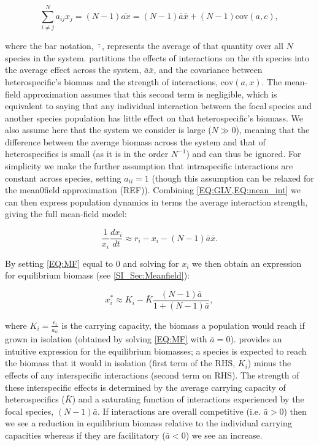 \documentclass{article}
\begin{document}
\begin{equation} \label{EQ:mean_int} 
    \sum^N_{i \neq j} a_{ij} x_j = (N-1) \bar{a x} = (N-1) \bar{a} \bar{x} + (N-1) \text{cov}(a,c),
\end{equation}

where the bar notation, $\bar{\cdot}$, represents the average of that quantity over all $N$ species in the system.  partitions the effects of interactions on the $i$th species into the average effect across the system, $\bar{a} \bar{x}$, and the covariance between heterospecific's biomass and the strength of interactions, $\text{cov}(a,x)$. The mean-field approximation assumes that this second term is negligible, which is equivalent to saying that any individual interaction between the focal species and another species population has little effect on that heterospecific's biomass. We also assume here that the system we consider is large ($N \gg 0$), meaning that the difference between the average biomass across the system and that of heterospecifics is small (as it is in the order $N^{-1}$) and can thus be ignored. For simplicity we make the further assumption that intraspecific interactions are constant across species, setting $a_{ii} = 1$ (though this assumption can be relaxed for the mean0field approximation (REF)). Combining \cref{EQ:GLV,EQ:mean_int} we can then express population dynamics in terms the average interaction strength, giving the full mean-field model:

\begin{equation} \label{EQ:MF}
    \frac{1}{x_i} \frac{dx_i}{dt} \approx r_i - x_i - (N-1)\bar{a}\bar{x}.
\end{equation}

By setting \cref{EQ:MF} equal to $0$ and solving for $x_i$ we then obtain an expression for equilibrium biomass (see \cref{SI_Sec:Meanfield}):

\begin{equation}\label{EQ:MF_eqi}
  x^*_i \approx K_i -  \bar{K}  \frac{ (N-1)\bar{a}}{1 + (N-1)\bar{a}}, 
\end{equation}

where $K_i = \frac{r_i}{a_{ii}}$ is the carrying capacity, the biomass a population would reach if grown in isolation (obtained by solving \cref{EQ:MF} with $\bar{a} = 0$).  provides an intuitive expression for the equilibrium biomasses; a species is expected to reach the biomass that it would in isolation (first term of the RHS, $K_i$) minus the effects of any interspecific interactions (second term on RHS). The strength of these interspecific effects is determined by the average carrying capacity of heterospecifics ($\bar{K}$) and a saturating function of interactions experienced by the focal species, $(N-1)\bar{a}$. If interactions are overall competitive (i.e. $ \bar{a} > 0$) then we see a reduction in equilibrium biomass relative to the individual carrying capacities whereas if they are facilitatory ($ \bar{a} < 0$) we see an increase.  
\end{document}

